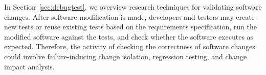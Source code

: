 In Section~\ref{sec:debugtest}, we overview research techniques for validating software changes. 
After software modification is made, developers and testers may create new tests or reuse existing tests based on the requirements specification, run the modified software against the tests, and check whether the software executes as expected. Therefore, the activity of checking the correctness of software changes could involve failure-inducing change isolation, regression testing, and change impact analysis. 
